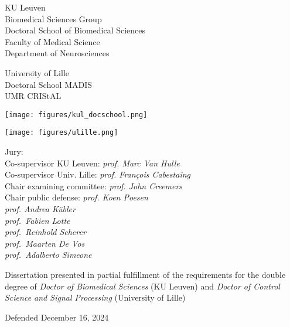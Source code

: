 {%
\small
\parindent0pt
  \sffamily
  \begin{minipage}[t]{.5\textwidth}
  \vspace{0pt}
  KU Leuven \\
  Biomedical Sciences Group \\
  Doctoral School of Biomedical Sciences \\
  Faculty of Medical Science \\
  Department of Neurosciences
  \bigskip

  University of Lille \\
  Doctoral School MADIS \\
  UMR CRIStAL \\

  \end{minipage}\hfill%
  \begin{minipage}[t]{.3\textwidth}
    \vspace{0pt}
    \texttt{[image: figures/kul\_docschool.png]}
    \smallskip

    \texttt{[image: figures/ulille.png]}
  \end{minipage}

  \vfill


  \vfill
  \begin{minipage}[b]{.6\textwidth}
    \raggedright
    Jury: \\
    Co-supervisor KU Leuven: \emph{prof. Marc Van Hulle} \\
    Co-supervisor Univ. Lille: \emph{prof. François Cabestaing} \\
    Chair examining committee: \emph{prof. John Creemers} \\
    Chair public defense: \emph{prof. Koen Poesen} \\
    \emph{prof. Andrea K\"ubler} \\
    \emph{prof.\ Fabien Lotte} \\
    \emph{prof.\ Reinhold Scherer} \\
    \emph{prof.\ Maarten De Vos} \\
    \emph{prof.\ Adalberto Simeone}
  \end{minipage}\hfill%
  \begin{minipage}[b]{.31\textwidth}
      \raggedright
      Dissertation presented in partial fulfillment of the requirements for
      the double degree of \emph{Doctor of Biomedical Sciences} (KU Leuven)
      and \emph{Doctor of Control Science and Signal Processing} (University
      of Lille)
  \end{minipage}
  \bigskip

  \centering
  \hfill Defended December 16, 2024\hfill
}
